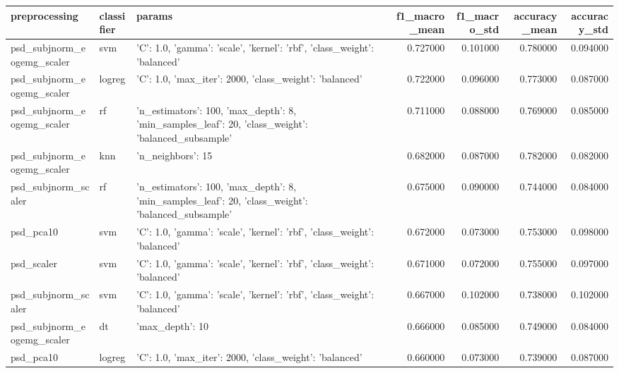 \begin{tabular}{lllrrrr}
\toprule
preprocessing & classifier & params & f1_macro_mean & f1_macro_std & accuracy_mean & accuracy_std \\
\midrule
psd_subjnorm_eogemg_scaler & svm & {'C': 1.0, 'gamma': 'scale', 'kernel': 'rbf', 'class_weight': 'balanced'} & 0.727000 & 0.101000 & 0.780000 & 0.094000 \\
psd_subjnorm_eogemg_scaler & logreg & {'C': 1.0, 'max_iter': 2000, 'class_weight': 'balanced'} & 0.722000 & 0.096000 & 0.773000 & 0.087000 \\
psd_subjnorm_eogemg_scaler & rf & {'n_estimators': 100, 'max_depth': 8, 'min_samples_leaf': 20, 'class_weight': 'balanced_subsample'} & 0.711000 & 0.088000 & 0.769000 & 0.085000 \\
psd_subjnorm_eogemg_scaler & knn & {'n_neighbors': 15} & 0.682000 & 0.087000 & 0.782000 & 0.082000 \\
psd_subjnorm_scaler & rf & {'n_estimators': 100, 'max_depth': 8, 'min_samples_leaf': 20, 'class_weight': 'balanced_subsample'} & 0.675000 & 0.090000 & 0.744000 & 0.084000 \\
psd_pca10 & svm & {'C': 1.0, 'gamma': 'scale', 'kernel': 'rbf', 'class_weight': 'balanced'} & 0.672000 & 0.073000 & 0.753000 & 0.098000 \\
psd_scaler & svm & {'C': 1.0, 'gamma': 'scale', 'kernel': 'rbf', 'class_weight': 'balanced'} & 0.671000 & 0.072000 & 0.755000 & 0.097000 \\
psd_subjnorm_scaler & svm & {'C': 1.0, 'gamma': 'scale', 'kernel': 'rbf', 'class_weight': 'balanced'} & 0.667000 & 0.102000 & 0.738000 & 0.102000 \\
psd_subjnorm_eogemg_scaler & dt & {'max_depth': 10} & 0.666000 & 0.085000 & 0.749000 & 0.084000 \\
psd_pca10 & logreg & {'C': 1.0, 'max_iter': 2000, 'class_weight': 'balanced'} & 0.660000 & 0.073000 & 0.739000 & 0.087000 \\
\bottomrule
\end{tabular}
